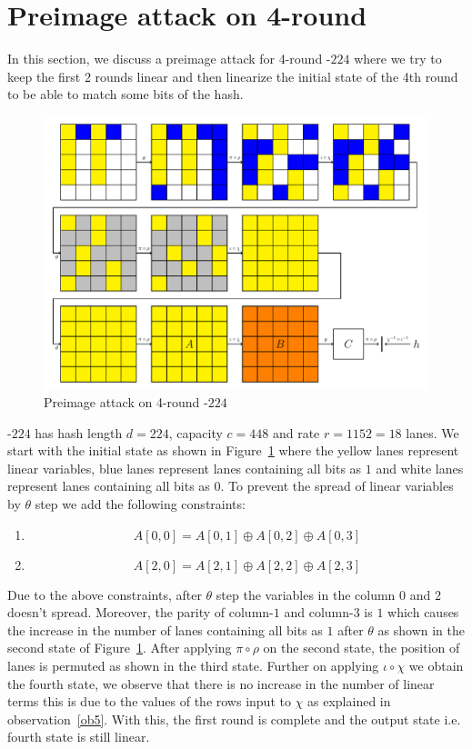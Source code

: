 \section{Preimage attack on 4-round }
    
In this section, we discuss a preimage attack for 4-round \KECCAK{}-$224$ where we try to keep the first 2 rounds linear and then linearize the initial state of the 4th round to be able to match some bits of the hash.
\begin{figure}[H]
    \includegraphics[scale=0.7]{4R,Keccak-224.pdf}
    \caption{Preimage attack on 4-round \KECCAK-$224$}
    \label{fig:keccak224}
\end{figure}

\KECCAK{}-$224$ has hash length $d=224$, capacity $c=448$ and rate $r = 1152 = 18$ lanes. We start with the initial state as shown in Figure~\ref{fig:keccak224} where the yellow lanes represent linear variables, blue lanes represent lanes containing all bits as $1$ and white lanes represent lanes containing all bits as $0$. To prevent the spread of linear variables by $\theta$ step we add the following constraints:

\begin{enumerate}
    \item \[
        A[0,0] = A[0,1] \oplus A[0,2] \oplus A[0, 3]
    \]
\item \[
        A[2,0] = A[2,1] \oplus A[2,2] \oplus A[2,3]
    \]
\end{enumerate}

Due to the above constraints, after $\theta$ step the variables in the column $0$ and $2$ doesn't spread. Moreover, the parity of column-$1$ and column-$3$ is $1$ which causes the increase in the number of lanes containing all bits as $1$ after $\theta$ as shown in the second state of Figure~\ref{fig:keccak224}. After applying $\pi \circ \rho$ on the second state, the position of lanes is permuted as shown in the third state. Further on applying $\iota \circ \chi$ we obtain the fourth state, we observe that there is no increase in the number of linear terms this is due to the values of the rows input to $\chi$ as explained in observation~\ref{ob5}. With this, the first round is complete and the output state i.e. fourth state is still linear.

